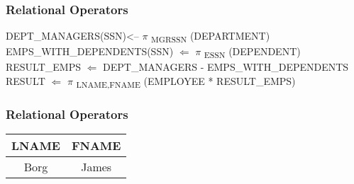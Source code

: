 \subsubsection*{Relational Operators}
DEPT\_MANAGERS(SSN)<-- $\pi$ \textsubscript{MGRSSN} (DEPARTMENT) \\
EMPS\_WITH\_DEPENDENTS(SSN) $\Leftarrow$ $\pi$ \textsubscript{ESSN} (DEPENDENT) \\
RESULT\_EMPS $\Leftarrow$ DEPT\_MANAGERS - EMPS\_WITH\_DEPENDENTS \\
RESULT $\Leftarrow$ $\pi$ \textsubscript{LNAME,FNAME} (EMPLOYEE * RESULT\_EMPS)

\subsubsection*{Relational Operators}
\begin{center}
\begin{tabular}{ c | c }
  LNAME & FNAME \\ \hline
  Borg & James \\
\end{tabular}
\end{center}